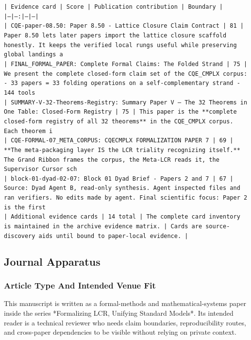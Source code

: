 \documentclass[11pt]{article}
\begin{document}
\noindent\texttt{| Evidence card | Score | Publication contribution | Boundary |}\\
\noindent\texttt{|---|---:|---|---|}\\
\noindent\texttt{| CQE-paper-08.50: Paper 8.50 - Lattice Closure Claim Contract | 81 | Paper 8.50 lets later papers import the lattice closure scaffold honestly. It keeps the verified local rungs useful while preserving global landings a}\\
\noindent\texttt{| FINAL\_FORMAL\_PAPER: Complete Formal Claims: The Folded Strand | 75 | We present the complete closed-form claim set of the CQE\_CMPLX corpus: - 33 papers = 33 folding operations on a self-complementary strand - 144 tools}\\
\noindent\texttt{| SUMMARY-V-32-Theorems-Registry: Summary Paper V — The 32 Theorems in One Table: Closed-Form Registry | 75 | This paper is the **complete closed-form registry of all 32 theorems** in the CQE\_CMPLX corpus. Each theorem i}\\
\noindent\texttt{| CQE-FORMAL-07\_META\_CORPUS: CQECMPLX FORMALIZATION PAPER 7 | 69 | **The meta-packaging layer IS the LCR triality recognizing itself.** The Grand Ribbon frames the corpus, the Meta-LCR reads it, the Supervisor Cursor sch}\\
\noindent\texttt{| block-01-dyad-02-07: Block 01 Dyad Brief - Papers 2 and 7 | 67 | Source: Dyad Agent B, read-only synthesis. Agent inspected files and ran verifiers. No edits made by agent. Final scientific focus: Paper 2 is the first }\\
\noindent\texttt{| Additional evidence cards | 14 total | The complete card inventory is maintained in the archive evidence matrix. | Cards are source-discovery aids until bound to paper-local evidence. |}\\

\subsection*{Journal Apparatus}

\subsubsection*{Article Type And Intended Venue Fit}

This manuscript is written as a formal-methods and mathematical-systems paper
inside the series *Formalizing LCR, Unifying Standard Models*. Its intended
reader is a technical reviewer who needs claim boundaries, reproducibility
routes, and cross-paper dependencies to be visible without relying on private
context.
\end{document}
